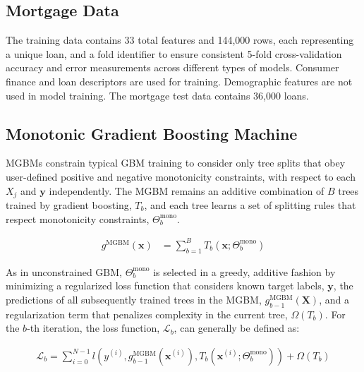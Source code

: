 \documentclass[information,article,submit,moreauthors,pdftex]{definitions/mdpi}
\begin{document}
\subsection{Mortgage Data}\label{ssec:mort_data}

The training data contains 33 total features and 144,000 rows, each representing a unique loan, and a fold identifier to ensure consistent 5-fold cross-validation accuracy and error measurements across different types of models. Consumer finance and loan descriptors are used for training. Demographic features are not used in model training. The mortgage test data contains 36,000 loans.

\subsection{Monotonic Gradient Boosting Machine}\label{ssec:mgbm}

MGBMs constrain typical GBM training to consider only tree splits that obey user-defined positive and negative monotonicity constraints, with respect to each $X_j$ and $\mathbf{y}$ independently. The MGBM remains an additive combination of $B$ trees trained by gradient boosting, $T_b$, and each tree learns a set of splitting rules that respect monotonicity constraints,  $\Theta^\text{mono}_b$. 

\begin{equation}
\begin{aligned}\label{eq:rf}
g^{\text{MGBM}}(\mathbf{x}) &= \sum_{b=1}^B T_b\left(\mathbf{x}; \Theta^\text{mono}_b\right)
\end{aligned}
\end{equation}

\noindent As in unconstrained GBM, $\Theta^{\text{mono}}_b$ is selected in a greedy, additive fashion by minimizing a regularized loss function that considers known target labels, $\mathbf{y}$, the predictions of all subsequently trained trees in the MGBM, $g^{\text{MGBM}}_{b-1}(\mathbf{X})$, and a regularization term that penalizes complexity in the current tree, $\Omega(T_b)$. For the $b$-th iteration, the loss function, $\mathcal{L}_{b}$, can generally be defined as:

\begin{equation}
\begin{aligned}
\mathcal{L}_{b} =\sum_{i=0}^{N-1}l(y^{(i)}, g^{\text{MGBM}}_{b-1}(\mathbf{x}^{(i)}), T_b(\mathbf{x}^{(i)};\Theta^\text{mono}_b)) + \Omega(T_b)\\
\end{aligned}
\end{equation}
\end{document}
